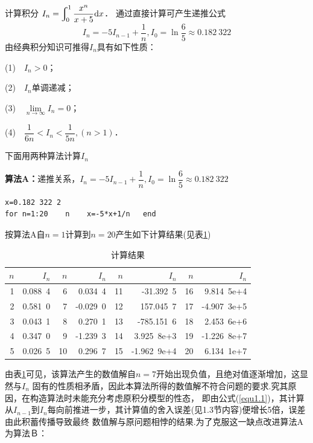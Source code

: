 \exam 计算积分 $I_n=\displaystyle\varint\nolimits_0^1\frac{x^n}{x+5}\mathrm{d}x$．
\Solution 通过直接计算可产生递推公式
\begin{equation} \label{equ1.1}
I_n=-5I_{n-1}+\frac{1}{n},I_0=\ln\frac{6}{5}\approx0.182\ 322
\end{equation}
由经典积分知识可推得$I_n$具有如下性质：

(1)~~$I_n>0$；

(2)~~$I_n$单调递减；

(3)~~$\lim\limits_{n\to\infty}I_n=0$；

(4)~~$\dfrac{1}{6n}<I_n<\dfrac{1}{5n},(n>1)$．

下面用两种算法计算$I_n$

{\bf
算法A：}递推关系，$I_n=-5I_{n-1}+\dfrac{1}{n},I_0=\ln\dfrac{6}{5}\approx0.182\ 322$

\begin{colorboxed}[oval=true,boxcolor=darkblue,bgcolor=white]
\begin{verbatim}
x=0.182 322 2
for n=1:20    n    x=-5*x+1/n   end
\end{verbatim}
\end{colorboxed}

按算法A自$n=1$计算到$n=20$产生如下计算结果(见表\ref{tab1-1})
\begin{table}[h]\begin{center}\color{darkblue}\caption{计算结果}\color{black}\label{tab1-1}
{\footnotesize
\begin{tabular}{r|r||r|r||r|r||r|r}\arrayrulecolor{darkblue}\hline\rowcolor{lightblue}
  $n$&$I_n$&$n$&$I_n$&$n$&$I_n$&$n$&$I_n$\\\hline
  1&0.088\ 4&6&0.034\ 4&11&-31.392\ 5&16&9.814\ 5e+4\\
  2&0.581\ 0&7&-0.029\ 0&12&157.045\ 7&17&-4.907\ 3e+5\\
  3&0.043\ 1&8&0.270\ 1&13&-785.151\ 6&18&2.453\ 6e+6\\
  4&0.347\ 0&9&-1.239\ 3&14&3.925\ 8e+3&19&-1.226\ 8e+7\\
  5&0.026\ 5&10&0.296\ 7&15&-1.962\ 9e+4&20&6.134\ 1e+7\\\hline
\end{tabular}}\end{center}\end{table}
由表\ref{tab1-1}可见，该算法产生的数值解自$n=7$开始出现负值，且绝对值逐渐增加，这显然与$I_n$
固有的性质相矛盾，因此本算法所得的数值解不符合问题的要求.究其原因，在构造算法时未能充分考虑原积分模型的性态，
即由公式(\ref{equ1.1})，其计算从$I_{n-1}$到$I_n$每向前推进一步，其计算值的舍入误差(见1.3节内容)便增长5倍，误差由此积蓄传播导致最终
数值解与原问题相悖的结果.为了克服这一缺点改进算法A为算法Ｂ：

